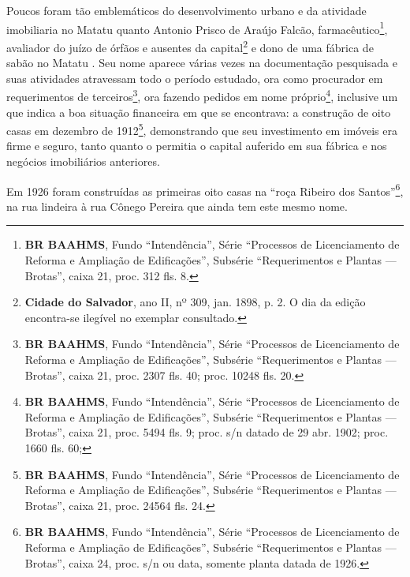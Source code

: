 
Poucos foram tão emblemáticos do desenvolvimento urbano e da atividade imobiliaria no Matatu quanto Antonio Prisco de Araújo Falcão, farmacêutico\footnote{\textbf{BR BAAHMS}, Fundo ``Intendência'', Série ``Processos de Licenciamento de Reforma e Ampliação de Edificações'', Subsérie ``Requerimentos e Plantas --- Brotas'', caixa 21, proc. 312 fls. 8.}, avaliador do juízo de órfãos e ausentes da capital\footnote{\textbf{Cidade do Salvador}, ano II, nº 309, jan. 1898, p. 2. O dia da edição encontra-se ilegível no exemplar consultado.} e dono de uma fábrica de sabão no Matatu \cite[p.~2732]{laemmert_almanak_1914}. Seu nome aparece várias vezes na documentação pesquisada e suas atividades atravessam todo o período estudado, ora como procurador em requerimentos de terceiros\footnote{\textbf{BR BAAHMS}, Fundo ``Intendência'', Série ``Processos de Licenciamento de Reforma e Ampliação de Edificações'', Subsérie ``Requerimentos e Plantas --- Brotas'', caixa 21, proc. 2307 fls. 40; proc. 10248 fls. 20.}, ora fazendo pedidos em nome próprio\footnote{\textbf{BR BAAHMS}, Fundo ``Intendência'', Série ``Processos de Licenciamento de Reforma e Ampliação de Edificações'', Subsérie ``Requerimentos e Plantas --- Brotas'', caixa 21, proc. 5494 fls. 9; proc. s/n datado de 29 abr. 1902; proc. 1660 fls. 60; }, inclusive um que indica a boa situação financeira em que se encontrava: a construção de oito casas em dezembro de 1912\footnote{\textbf{BR BAAHMS}, Fundo ``Intendência'', Série ``Processos de Licenciamento de Reforma e Ampliação de Edificações'', Subsérie ``Requerimentos e Plantas --- Brotas'', caixa 21, proc. 24564 fls. 24.}, demonstrando que seu investimento em imóveis era firme e seguro, tanto quanto o permitia o capital auferido em sua fábrica e nos negócios imobiliários anteriores.





Em 1926 foram construídas as primeiras oito casas na ``roça Ribeiro dos Santos''\footnote{\textbf{BR BAAHMS}, Fundo ``Intendência'', Série ``Processos de Licenciamento de Reforma e Ampliação de Edificações'', Subsérie ``Requerimentos e Plantas --- Brotas'', caixa 24, proc. s/n ou data, somente planta datada de 1926.}, na rua lindeira à rua Cônego Pereira que ainda tem este mesmo nome.


